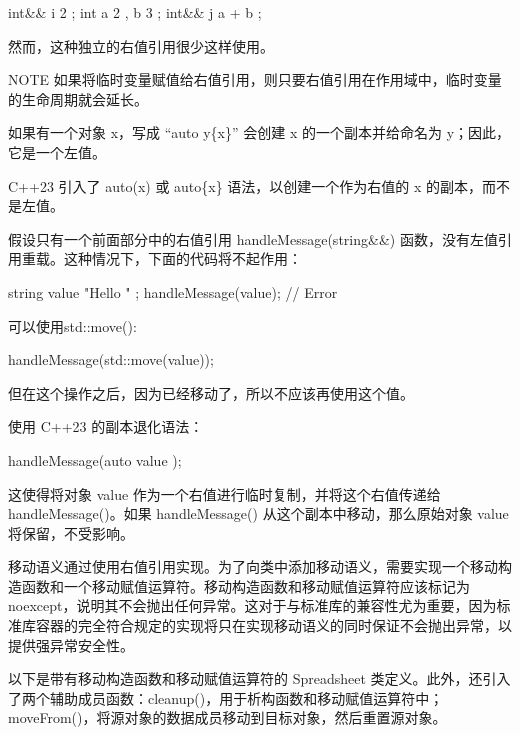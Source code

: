 \begin{cpp}
int&& i { 2 };
int a { 2 }, b { 3 };
int&& j { a + b };
\end{cpp}

然而，这种独立的右值引用很少这样使用。

\begin{myNotic}{NOTE}
如果将临时变量赋值给右值引用，则只要右值引用在作用域中，临时变量的生命周期就会延长。
\end{myNotic}



如果有一个对象 x，写成 “auto y\{x\}” 会创建 x 的一个副本并给命名为 y；因此，它是一个左值。

C++23 引入了 auto(x) 或 auto\{x\} 语法，以创建一个作为右值的 x 的副本，而不是左值。

假设只有一个前面部分中的右值引用 handleMessage(string\&\&) 函数，没有左值引用重载。这种情况下，下面的代码将不起作用：

\begin{cpp}
string value { "Hello " };
handleMessage(value); // Error
\end{cpp}

可以使用std::move():

\begin{cpp}
handleMessage(std::move(value));
\end{cpp}

但在这个操作之后，因为已经移动了，所以不应该再使用这个值。

使用 C++23 的副本退化语法：

\begin{cpp}
handleMessage(auto { value });
\end{cpp}

这使得将对象 value 作为一个右值进行临时复制，并将这个右值传递给 handleMessage()。如果 handleMessage() 从这个副本中移动，那么原始对象 value 将保留，不受影响。


移动语义通过使用右值引用实现。为了向类中添加移动语义，需要实现一个移动构造函数和一个移动赋值运算符。移动构造函数和移动赋值运算符应该标记为 noexcept，说明其不会抛出任何异常。这对于与标准库的兼容性尤为重要，因为标准库容器的完全符合规定的实现将只在实现移动语义的同时保证不会抛出异常，以提供强异常安全性。

以下是带有移动构造函数和移动赋值运算符的 Spreadsheet 类定义。此外，还引入了两个辅助成员函数：cleanup()，用于析构函数和移动赋值运算符中；moveFrom()，将源对象的数据成员移动到目标对象，然后重置源对象。

